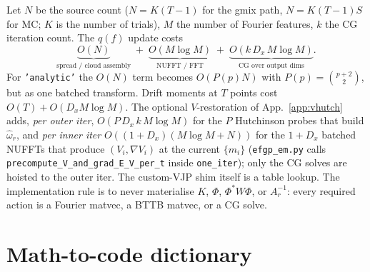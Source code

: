 \documentclass[11pt]{article}
\newcommand{\code}[1]{\texttt{\small #1}}
\begin{document}
Let $N$ be the source count ($N = K(T{-}1)$ for the gmix path,
$N=K(T{-}1)S$ for MC; $K$ is the number of trials), $M$ the number of
Fourier features, $k$ the CG iteration count. The $q(f)$ update costs
\begin{equation}
\underbrace{O(N)}_{\text{spread / cloud assembly}}
\;+\;
\underbrace{O(M\log M)}_{\text{NUFFT / FFT}}
\;+\;
\underbrace{O(k\, D_x\, M\log M)}_{\text{CG over output dims}}.
\end{equation}
For \code{'analytic'} the $O(N)$ term becomes $O(P(p)N)$ with
$P(p)=\binom{p+2}{2}$, but as one batched transform. Drift moments at
$T$ points cost $O(T) + O(D_x M\log M)$. The optional $V$-restoration of
App.~\ref{app:vhutch} adds, \emph{per outer iter},
$O(P\,D_x\,k\,M\log M)$ for the $P$ Hutchinson probes that build
$\hat\omega_r$, and \emph{per inner iter} $O((1{+}D_x)(M\log M + N))$ for
the $1{+}D_x$ batched NUFFTs that produce $(V_i,\nabla V_i)$ at the
current $\{m_i\}$ (\code{efgp\_em.py} calls
\code{precompute\_V\_and\_grad\_E\_V\_per\_t} inside \code{one\_iter});
only the CG solves are hoisted to the outer iter. The custom-VJP shim
itself is a table lookup. The implementation rule is to never materialise
$K$, $\Phi$, $\Phi^*W\Phi$, or $A_r^{-1}$: every required action is a
Fourier matvec, a BTTB matvec, or a CG solve.

\appendix

\section{Math-to-code dictionary}
\label{app:dictionary}
\end{document}
